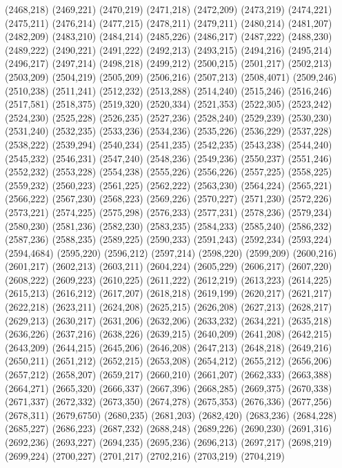 (2468,218)
(2469,221)
(2470,219)
(2471,218)
(2472,209)
(2473,219)
(2474,221)
(2475,211)
(2476,214)
(2477,215)
(2478,211)
(2479,211)
(2480,214)
(2481,207)
(2482,209)
(2483,210)
(2484,214)
(2485,226)
(2486,217)
(2487,222)
(2488,230)
(2489,222)
(2490,221)
(2491,222)
(2492,213)
(2493,215)
(2494,216)
(2495,214)
(2496,217)
(2497,214)
(2498,218)
(2499,212)
(2500,215)
(2501,217)
(2502,213)
(2503,209)
(2504,219)
(2505,209)
(2506,216)
(2507,213)
(2508,4071)
(2509,246)
(2510,238)
(2511,241)
(2512,232)
(2513,288)
(2514,240)
(2515,246)
(2516,246)
(2517,581)
(2518,375)
(2519,320)
(2520,334)
(2521,353)
(2522,305)
(2523,242)
(2524,230)
(2525,228)
(2526,235)
(2527,236)
(2528,240)
(2529,239)
(2530,230)
(2531,240)
(2532,235)
(2533,236)
(2534,236)
(2535,226)
(2536,229)
(2537,228)
(2538,222)
(2539,294)
(2540,234)
(2541,235)
(2542,235)
(2543,238)
(2544,240)
(2545,232)
(2546,231)
(2547,240)
(2548,236)
(2549,236)
(2550,237)
(2551,246)
(2552,232)
(2553,228)
(2554,238)
(2555,226)
(2556,226)
(2557,225)
(2558,225)
(2559,232)
(2560,223)
(2561,225)
(2562,222)
(2563,230)
(2564,224)
(2565,221)
(2566,222)
(2567,230)
(2568,223)
(2569,226)
(2570,227)
(2571,230)
(2572,226)
(2573,221)
(2574,225)
(2575,298)
(2576,233)
(2577,231)
(2578,236)
(2579,234)
(2580,230)
(2581,236)
(2582,230)
(2583,235)
(2584,233)
(2585,240)
(2586,232)
(2587,236)
(2588,235)
(2589,225)
(2590,233)
(2591,243)
(2592,234)
(2593,224)
(2594,4684)
(2595,220)
(2596,212)
(2597,214)
(2598,220)
(2599,209)
(2600,216)
(2601,217)
(2602,213)
(2603,211)
(2604,224)
(2605,229)
(2606,217)
(2607,220)
(2608,222)
(2609,223)
(2610,225)
(2611,222)
(2612,219)
(2613,223)
(2614,225)
(2615,213)
(2616,212)
(2617,207)
(2618,218)
(2619,199)
(2620,217)
(2621,217)
(2622,218)
(2623,211)
(2624,208)
(2625,215)
(2626,208)
(2627,213)
(2628,217)
(2629,213)
(2630,217)
(2631,206)
(2632,206)
(2633,232)
(2634,221)
(2635,218)
(2636,226)
(2637,216)
(2638,226)
(2639,215)
(2640,209)
(2641,208)
(2642,215)
(2643,209)
(2644,215)
(2645,206)
(2646,208)
(2647,213)
(2648,218)
(2649,216)
(2650,211)
(2651,212)
(2652,215)
(2653,208)
(2654,212)
(2655,212)
(2656,206)
(2657,212)
(2658,207)
(2659,217)
(2660,210)
(2661,207)
(2662,333)
(2663,388)
(2664,271)
(2665,320)
(2666,337)
(2667,396)
(2668,285)
(2669,375)
(2670,338)
(2671,337)
(2672,332)
(2673,350)
(2674,278)
(2675,353)
(2676,336)
(2677,256)
(2678,311)
(2679,6750)
(2680,235)
(2681,203)
(2682,420)
(2683,236)
(2684,228)
(2685,227)
(2686,223)
(2687,232)
(2688,248)
(2689,226)
(2690,230)
(2691,316)
(2692,236)
(2693,227)
(2694,235)
(2695,236)
(2696,213)
(2697,217)
(2698,219)
(2699,224)
(2700,227)
(2701,217)
(2702,216)
(2703,219)
(2704,219)
